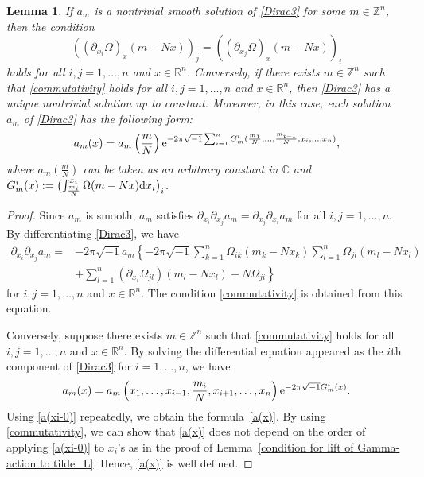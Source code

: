 \documentclass[10pt,a4paper]{amsart}
\numberwithin{equation}{section}
\newtheorem{Lemma}[Theorem]{Lemma}
\newcommand{\C}{\mathbb{C}}
\newcommand{\R}{\mathbb{R}}
\newcommand{\Z}{\mathbb{Z}}
\begin{document}
\begin{Lemma}\label{basis of kerD}
If $a_m$ is a nontrivial smooth solution of \eqref{Dirac3} for some $m\in \Z^n$, then the condition
\begin{equation}\label{commutativity}
\left(\left(\partial_{x_i}\Omega\right)_x(m-Nx)\right)_j=\left(\left(\partial_{x_j}\Omega\right)_x(m-Nx)\right)_i
\end{equation}
holds  for all $i, j=1,\ldots , n$ and $x\in \R^n$.
Conversely, if there exists $m\in \Z^n$ such that \eqref{commutativity} holds for all $i, j=1,\ldots , n$ and $x\in \R^n$,
then \eqref{Dirac3} has a unique nontrivial solution up to constant. Moreover, in this case, each solution $a_m$ of \eqref{Dirac3} has the following form:
\begin{equation}\label{a(x)}
a_m(x)=a_m\left(\frac{m}{N}\right){\rm e}^{-2\pi\sqrt{-1}\sum_{i=1}^nG_m^i(\frac{m_1}{N},\ldots ,\frac{m_{i-1}}{N},x_i,\ldots ,x_n)},
\end{equation}
where $a_m(\frac{m}{N})$ can be taken as an arbitrary constant in $\C$ and
$
G_m^i(x):=\bigl(\int_{\frac{m_i}{N}}^{x_i}\Omega(m-Nx){\rm d}x_i\bigr)_i $.
\end{Lemma}
\begin{proof}
Since $a_m$ is smooth, $a_m$ satisfies $\partial_{x_i}\partial_{x_j}a_m=\partial_{x_j}\partial_{x_i}a_m$ for all $i, j=1,\ldots ,n$. By differentiating \eqref{Dirac3}, we have
\begin{align*}
\partial_{x_i}\partial_{x_j}a_m={}&-2\pi\sqrt{-1}a_m\left\{-2\pi\sqrt{-1}\sum_{k=1}^n\Omega_{ik}(m_k-Nx_k)\sum_{l=1}^n\Omega_{jl}(m_l-Nx_l)\right.\\
&\left.
+\sum_{l=1}^n\left(\partial_{x_i}\Omega_{jl}\right)(m_l-Nx_l)-N\Omega_{ji}\right\}
\end{align*}
for $i, j=1, \ldots ,n$ and $x\in \R^n$. The condition \eqref{commutativity} is obtained from this equation.

Conversely, suppose there exists $m\in \Z^n$ such that \eqref{commutativity} holds for all $i, j=1,\ldots , n$ and $x\in \R^n$. By solving the differential equation appeared as the $i$th component of \eqref{Dirac3} for $i=1,\ldots ,n$, we have
\begin{equation}\label{a(xi-0)}
a_m(x)=a_m\left(x_1,\ldots ,x_{i-1},\frac{m_i}{N},x_{i+1},\ldots ,x_n\right){\rm e}^{-2\pi\sqrt{-1}G_m^i(x)}.
\end{equation}
Using \eqref{a(xi-0)} repeatedly, we obtain the formula~\eqref{a(x)}.
By using \eqref{commutativity}, we can show that \eqref{a(x)} does not depend on the order of applying \eqref{a(xi-0)} to $x_i$'s as in the proof of Lemma~\ref{condition for lift of Gamma-action to tilde_L}. Hence, \eqref{a(x)} is well defined.
\end{proof}
\end{document}
